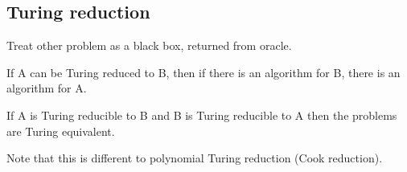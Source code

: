
\subsection{Turing reduction}

Treat other problem as a black box, returned from oracle.

If A can be Turing reduced to B, then if there is an algorithm for B, there is an algorithm for A.

If A is Turing reducible to B and B is Turing reducible to A then the problems are Turing equivalent.

Note that this is different to polynomial Turing reduction (Cook reduction).
